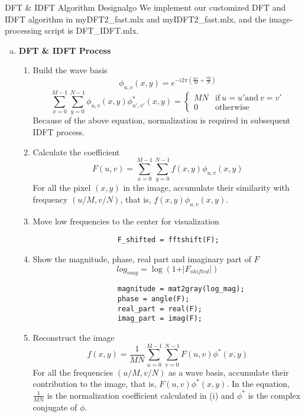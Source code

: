\begin{problem}{DFT \& IDFT Algorithm Design}{algo}
    We implement our customized DFT and IDFT algorithm in myDFT2\_fast.mlx and myIDFT2\_fast.mlx, and the image-processing script is DFT\_IDFT.mlx.
\begin{enumerate}[(a)]
    \item \textbf{DFT \& IDFT Process}
    \begin{enumerate}[label = (\roman*)]
        \item Build the wave basis 
        $$\phi_{u,v}(x,y) = e^{-i2\pi (\frac{ux}{M}+\frac{vy}{N})}$$
        $$
        \sum_{x=0}^{M-1} \sum_{y=0}^{N-1}\phi_{u,v}(x,y)\phi^*_{u',v'}(x,y)=
        \begin{cases}
        MN &\text{if}\ u=u' \text{and}\ v=v'\\
        0&\text{otherwise}
        \end{cases}
        $$
        Because of the above equation, normalization is required in subsequent IDFT process.
        
        
        \item Calculate the coefficient 
        $$F(u,v) = \sum_{x=0}^{M-1} \sum_{y=0}^{N-1} f(x,y)\phi_{u,v}(x,y)$$
        For all the pixel $(x, y)$ in the image, accumulate their similarity with frequency $(u/M, v/N)$, that is, $f(x,y)\phi_{u,v}(x,y)$.

        \item Move low frequencies to the center for visualization
        \begin{verbatim}
                    F_shifted = fftshift(F); 
        \end{verbatim}

        \item Show the magnitude, phase, real part and imaginary part of $F$
        $$log_{mag}=\log(1 + \vert F_{shifted}\vert)$$
        \begin{verbatim}
                    magnitude = mat2gray(log_mag);
                    phase = angle(F);
                    real_part = real(F);
                    imag_part = imag(F);  
        \end{verbatim}

        \item Reconstruct the image
        $$f(x,y)=\frac{1}{MN}\sum_{u=0}^{M-1}\sum_{v=0}^{N-1}F(u,v)\phi^*(x,y)$$
        For all the frequencies $(u/M, v/N)$ as a wave basis, accumulate their contribution to the image, that is, $F(u,v)\phi^*(x,y)$. In the equation, $\frac{1}{MN}$ is the normalization coefficient calculated in (i) and $\phi^*$ is the complex conjugate of $\phi$.
    \end{enumerate}


\end{enumerate}
\end{problem}
